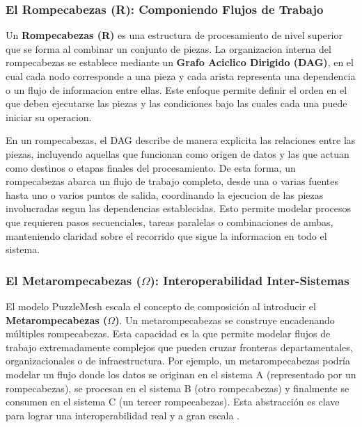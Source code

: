 \subsubsection{El Rompecabezas (R): Componiendo Flujos de Trabajo}

Un \textbf{Rompecabezas (R)} es una estructura de procesamiento de nivel superior que se forma al combinar un conjunto de piezas. La organizacion interna del rompecabezas se establece mediante un \textbf{Grafo Aciclico Dirigido (DAG)}, en el cual cada nodo corresponde a una pieza y cada arista representa una dependencia o un flujo de informacion entre ellas. Este enfoque permite definir el orden en el que deben ejecutarse las piezas y las condiciones bajo las cuales cada una puede iniciar su operacion.

En un rompecabezas, el DAG describe de manera explicita las relaciones entre las piezas, incluyendo aquellas que funcionan como origen de datos y las que actuan como destinos o etapas finales del procesamiento. De esta forma, un rompecabezas abarca un flujo de trabajo completo, desde una o varias fuentes hasta uno o varios puntos de salida, coordinando la ejecucion de las piezas involucradas segun las dependencias establecidas. Esto permite modelar procesos que requieren pasos secuenciales, tareas paralelas o combinaciones de ambas, manteniendo claridad sobre el recorrido que sigue la informacion en todo el sistema.

\subsubsection{El Metarompecabezas ($\Omega$): Interoperabilidad Inter-Sistemas}
El modelo PuzzleMesh escala el concepto de composición al introducir el \textbf{Metarompecabezas ($\Omega$)}. Un metarompecabezas se construye encadenando múltiples rompecabezas. Esta capacidad es la que permite modelar flujos de trabajo extremadamente complejos que pueden cruzar fronteras departamentales, organizacionales o de infraestructura. Por ejemplo, un metarompecabezas podría modelar un flujo donde los datos se originan en el sistema A (representado por un rompecabezas), se procesan en el sistema B (otro rompecabezas) y finalmente se consumen en el sistema C (un tercer rompecabezas). Esta abstracción es clave para lograr una interoperabilidad real y a gran escala \cite{sanchez2022puzzlemesh}.

